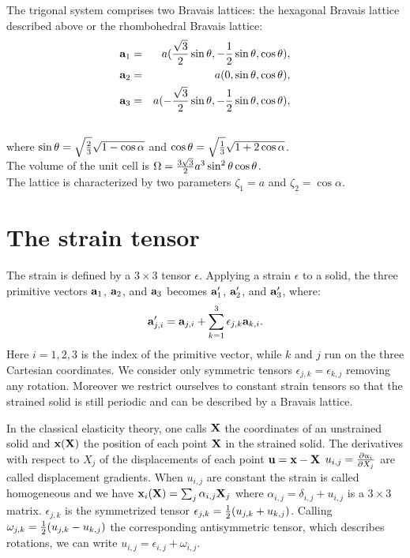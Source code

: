 \documentclass[12pt,a4paper,twoside]{report}
\begin{document}
The trigonal system comprises two Bravais lattices: the hexagonal Bravais 
lattice described above or the rhombohedral Bravais lattice:
\begin{eqnarray}
{\bf a}_1 &=& a ({\sqrt{3}\over 2}\sin{\theta}, -{1\over 2} \sin{\theta},
          \cos{\theta}), 
\nonumber \\
{\bf a}_2 &=& a (0, \sin{\theta}, \cos{\theta}), 
\nonumber \\
{\bf a}_3 &=& a (-{\sqrt{3}\over 2} \sin{\theta}, -{1\over 2} \sin{\theta},
         \cos{\theta}), 
\nonumber \\
\nonumber
\end{eqnarray}
where $\sin{\theta}=\sqrt{2\over 3}\sqrt{1-\cos{\alpha}}$
and $\cos{\theta}=\sqrt{1\over 3}\sqrt{1 + 2 \cos{\alpha}}$. \\
The volume of the unit cell is $\Omega={3 \sqrt{3} \over 2} a^3 \sin^2\theta
\cos\theta$. \\
The lattice is characterized by two parameters $\zeta_1=a$ and 
$\zeta_2=\cos\alpha$.

\newpage

{\color{dark-blue}\chapter{The strain tensor}}
\color{black}

The strain is defined by a $3\times 3$ tensor
$\epsilon$. Applying a strain $\epsilon$ to a solid, 
the three primitive vectors ${\bf a}_1$, ${\bf a}_2$, and ${\bf a}_3$
becomes 
${\bf a}'_1$, ${\bf a}'_2$, and ${\bf a}'_3$, where:
\begin{equation}
{\bf a}'_{j,i} = {\bf a}_{j,i} +  \sum_{k=1}^3 \epsilon_{j,k} {\bf a}_{k,i}.
\label{strain_def}
\end{equation}
Here $i=1,2,3$ is the index of the primitive vector, while $k$ and $j$ run
on the three Cartesian coordinates. We consider only symmetric 
tensors $\epsilon_{j,k}=\epsilon_{k,j}$ removing any rotation. Moreover
we restrict ourselves to constant strain tensors so that the strained
solid is still periodic and can be described by a Bravais lattice.

In the classical elasticity theory, one
calls ${\bf X}$ the coordinates of an unstrained solid and
${\bf x}({\bf X})$ the position of each point ${\bf X}$ in
the strained solid. The derivatives with respect to $X_j$ of the
displacements of each point ${\bf u}= {\bf x} -{\bf X}$ 
$u_{i,j}= {\partial u_i \over \partial X_j}$ are called
displacement gradients. When $u_{i,j}$ are constant the strain
is called homogeneous and we have ${\bf x}_i({\bf X}) = 
\sum_j\alpha_{i,j} {\bf X}_j$ where 
$\alpha_{i,j}=\delta_{i,j}+u_{i,j}$ is a $3\times 3$ matrix. 
$\epsilon_{j,k}$
is the symmetrized tensor $\epsilon_{j,k}={1\over 2} ( u_{j,k} +
u_{k,j})$. Calling $\omega_{j,k}={1\over 2} ( u_{j,k} -
u_{k,j})$ the corresponding antisymmetric tensor, which describes
rotations, we can write $u_{i,j}=\epsilon_{i,j}+\omega_{i,j}$.
\end{document}
